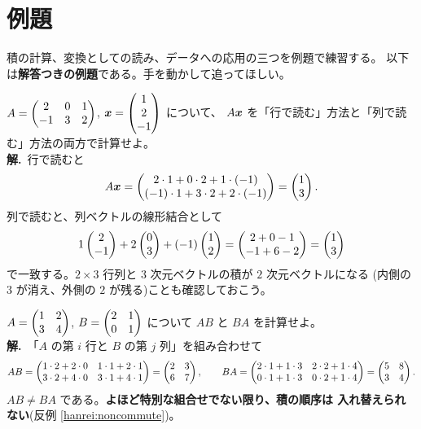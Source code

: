 \section{例題}

積の計算、変換としての読み、データへの応用の三つを例題で練習する。
以下は\textbf{解答つきの例題}である。手を動かして追ってほしい。

\begin{rei}[例題・基本(行列 × ベクトル)]
$A = \begin{pmatrix}2 & 0 & 1 \\ -1 & 3 & 2\end{pmatrix}$, $\bm{x} = \begin{pmatrix}1 \\ 2 \\ -1\end{pmatrix}$ について、
$A\bm{x}$ を「行で読む」方法と「列で読む」方法の両方で計算せよ。\\
\textbf{解.}\ 行で読むと
\[
A\bm{x} = \begin{pmatrix}2 \cdot 1 + 0 \cdot 2 + 1 \cdot (-1) \\
(-1) \cdot 1 + 3 \cdot 2 + 2 \cdot (-1)\end{pmatrix} = \begin{pmatrix}1 \\ 3\end{pmatrix}.
\]
列で読むと、列ベクトルの線形結合として
\[
1\begin{pmatrix}2 \\ -1\end{pmatrix} + 2\begin{pmatrix}0 \\ 3\end{pmatrix} + (-1)\begin{pmatrix}1 \\ 2\end{pmatrix}
= \begin{pmatrix}2 + 0 - 1 \\ -1 + 6 - 2\end{pmatrix} = \begin{pmatrix}1 \\ 3\end{pmatrix}
\]
で一致する。$2 \times 3$ 行列と $3$ 次元ベクトルの積が $2$ 次元ベクトルになる
(内側の $3$ が消え、外側の $2$ が残る)ことも確認しておこう。
\end{rei}

\begin{rei}[例題・基本(行列どうしの積)]
$A = \begin{pmatrix}1 & 2 \\ 3 & 4\end{pmatrix}$, $B = \begin{pmatrix}2 & 1 \\ 0 & 1\end{pmatrix}$ について
$AB$ と $BA$ を計算せよ。\\
\textbf{解.}\ 「$A$ の第 $i$ 行と $B$ の第 $j$ 列」を組み合わせて
\[
AB = \begin{pmatrix}1 \cdot 2 + 2 \cdot 0 & 1 \cdot 1 + 2 \cdot 1 \\
3 \cdot 2 + 4 \cdot 0 & 3 \cdot 1 + 4 \cdot 1\end{pmatrix} = \begin{pmatrix}2 & 3 \\ 6 & 7\end{pmatrix},
\qquad
BA = \begin{pmatrix}2 \cdot 1 + 1 \cdot 3 & 2 \cdot 2 + 1 \cdot 4 \\
0 \cdot 1 + 1 \cdot 3 & 0 \cdot 2 + 1 \cdot 4\end{pmatrix} = \begin{pmatrix}5 & 8 \\ 3 & 4\end{pmatrix}.
\]
$AB \neq BA$ である。\textbf{よほど特別な組合せでない限り、積の順序は
入れ替えられない}(反例 \ref{hanrei:noncommute})。
\end{rei}

